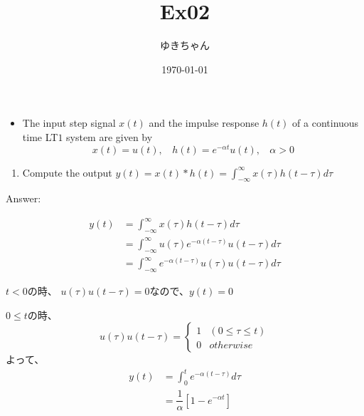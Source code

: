 \documentclass[a4paper,16pt]{jsarticle}
\title{Ex02}
\author{ゆきちゃん}
\date{\today}
\begin{document}
\maketitle

\begin{itemize}
	\item The input step signal $x(t)$ and the impulse response $h(t)$ of a continuous time LT$1$ system are given by
	\begin{equation}
		x(t) = u(t),~~~~h(t) = e^{-\alpha t}u(t),~~~~\alpha > 0
	\end{equation}
\end{itemize}

\begin{enumerate}
	\item Compute the output $y(t) = x(t)*h(t) = \int_{-\infty}^\infty x(\tau)h(t-\tau) d\tau$
\end{enumerate}

Answer:

\begin{align}
	y(t) &= \int_{-\infty}^\infty x(\tau)h(t-\tau) d\tau \\
	&= \int_{-\infty}^\infty u(\tau)e^{-\alpha (t-\tau)}u(t-\tau) d\tau \\
	&= \int_{-\infty}^\infty e^{-\alpha (t-\tau)}u(\tau)u(t-\tau) d\tau
\end{align}

$t < 0$の時、
$u(\tau)u(t-\tau) = 0$なので、$y(t) = 0$

$0 \leq t$の時、
\begin{equation*}
	u(\tau)u(t-\tau) =
	\begin{cases}
		1 & (0 \leq \tau \leq t) \\
		0 & otherwise
	\end{cases}
\end{equation*}
よって、
\begin{align}
	y(t) &= \int_0^t e^{-\alpha (t-\tau)} d\tau \\
	&= \dfrac{1}{\alpha}[ 1 - e^{-\alpha t}]
\end{align}
\end{document}
